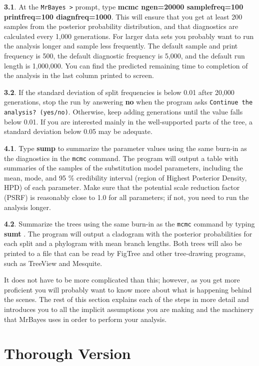 \documentclass[12pt]{book}
\begin{document}
\textbf{3.1}. At the \texttt{MrBayes >} prompt, type \textbf{mcmc ngen=20000 samplefreq=100 printfreq=100
 diagnfreq=1000}. This will ensure that you get at least 200 samples from the posterior probability 
 distribution, and that diagnostics are calculated every 1,000 generations. For larger data sets you
 probably want to run the analysis longer and sample less frequently. The default sample and print frequency
 is 500, the default diagnostic frequency is 5,000, and the default run length is 1,000,000. You can find
 the predicted remaining time to completion of the analysis in the last column printed to screen.

\textbf{3.2}. If the standard deviation of split frequencies is below 0.01 after 20,000 generations,
 stop the run by answering \textbf{no} when the program asks \texttt{Continue the analysis? (yes/no)}.
 Otherwise, keep adding generations until the value falls below 0.01. If you are interested mainly in
 the well-supported parts of the tree, a standard deviation below 0.05 may be adequate.

\textbf{4.1}. Type \textbf{sump} to summarize the parameter values using the same burn-in as the
 diagnostics in the \texttt{mcmc} command. The program will output a table with summaries of the samples
 of the substitution model parameters, including the mean, mode, and 95 \% credibility interval
 (region of Highest Posterior Density, HPD) of each parameter. Make sure that the potential scale reduction
 factor (PSRF) is reasonably close to 1.0 for all parameters; if not, you need to run the analysis longer.

\textbf{4.2}. Summarize the trees using the same burn-in as the \texttt{mcmc} command by typing \textbf{sumt}
. The program will output a cladogram with the posterior probabilities for each split and a phylogram with
 mean branch lengths. Both trees will also be printed to a file that can be read by FigTree and other
 tree-drawing programs, such as TreeView and Mesquite.

It does not have to be more complicated than this; however, as you get more proficient you will probably
 want to know more about what is happening behind the scenes. The rest of this section explains each of
 the steps in more detail and introduces you to all the implicit assumptions you are making and the
 machinery that MrBayes uses in order to perform your analysis.

\section{Thorough Version}
\end{document}
